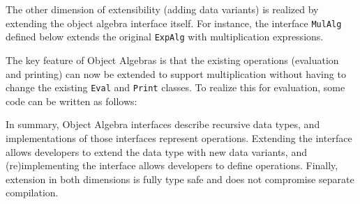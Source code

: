 The other dimension of extensibility (adding data variants) is  realized by extending the object algebra interface itself. For instance, 
the interface \lstinline{MulAlg} defined below extends the original \lstinline{ExpAlg} with multiplication expressions.


The key feature of Object Algebras is that the existing operations (evaluation and printing) can now be extended to support multiplication without having to change the existing \lstinline{Eval} and \lstinline{Print} classes. To realize this for evaluation, some code can be written as follows:


In summary, Object Algebra interfaces  describe recursive data types, and implementations of those interfaces represent operations. Extending the interface allows developers to extend the data type with new data variants, and (re)implementing the interface allows developers to define operations.
Finally, extension in both dimensions is fully type safe and does not compromise separate compilation.


\begin{comment}

This paper showed how various types of traversals for complex
structures can be automatically provided by \Name. \name traversals are
written directly in Java and are type-safe, extensible and separately
compilable. There has always been a tension between the
correctness guarantees of static typing, and the flexibility of
untyped/dynamically-typed approaches. \name shows that even
in type systems like Java's, it is possible to get considerable
flexibility and adaptability for the problem of boilerplate code in
traversals of complex structures, without giving up modular static typing.

There are many of avenues for future work. One area of research is to
extend \name traversals to support flexible traversal strategies,
similarly to strategic
programming~\cite{borovansky1996elan,visser1998core,vandenBrand:2003:TRT:941566.941568}. Another
line of work worth exploring is to adopt generalizations of object
algebras~\cite{oliveira13fop} for added expressiveness of \name
traversals.

\end{comment}
